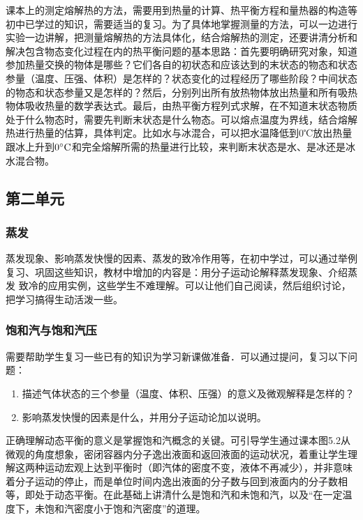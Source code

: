 课本上的测定熔解热的方法，需要用到热量的计算、热平衡方程和量热器的构造等初中已学过的知识，需要适当的复习。为了具体地掌握测量的方法，可以一边进行实验一边讲解，把测量熔解热的方法具体化，结合熔解热的测定，还要讲清分析和解决包含物态变化过程在内的热平衡问题的基本思路：首先要明确研究对象，知道参加热量交换的物体是哪些？它们各自的初状态和应该达到的末状态的物态和状态参量（温度、压强、体积）是怎样的？状态变化的过程经历了哪些阶段？中间状态的物态和状态参量又是怎样的？然后，分别列出所有放热物体放出热量和所有吸热物体吸收热量的数学表达式。最后，由热平衡方程列式求解，在不知道末状态物质处于什么物态时，需要先判断末状态是什么物态。可以熔点温度为界线，结合熔解热进行热量的估算，具体判定。比如水与冰混合，可以把水温降低到0℃放出热量跟冰上升到$0^{\circ}{\rm C}$和完全熔解所需的热量进行比较，来判断末状态是水、是冰还是冰水混合物。

\subsection{第二单元}
\subsubsection{蒸发}

蒸发现象、影响蒸发快慢的因素、蒸发的致冷作用等，在初中学过，可以通过举例复习、巩固这些知识，教材中增加的内容是：用分子运动论解释蒸发现象、介绍蒸发
致冷的应用实例，这些学生不难理解。可以让他们自己阅读，然后组织讨论，把学习搞得生动活泼一些。

\subsubsection{饱和汽与饱和汽压}

需要帮助学生复习一些已有的知识为学习新课做准备．可以通过提问，复习以下问题：
\begin{enumerate}
\item 描述气体状态的三个参量（温度、体积、压强）的意义及微观解释是怎样的？
\item 影响蒸发快慢的因素是什么，并用分子运动论加以说明。
\end{enumerate}

正确理解动态平衡的意义是掌握饱和汽概念的关键。可引导学生通过课本图5.2从微观的角度想象，密闭容器内分子逸出液面和返回液面的运动状况，着重让学生理解这两种运动宏观上达到平衡时（即汽体的密度不变，液体不再减少），并非意味着分子运动的停止，而是单位时间内逸出液面的分子数与回到液面内的分子数相等，即处于动态平衡。在此基础上讲清什么是饱和汽和未饱和汽，以及“在一定温度下，未饱和汽密度小于饱和汽密度”的道理。

